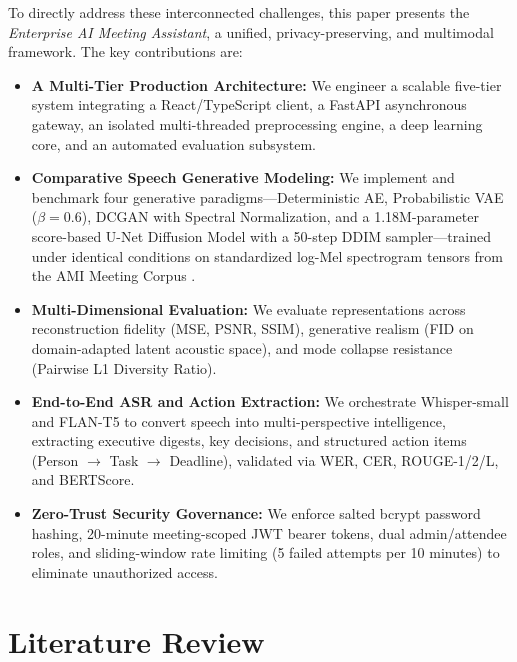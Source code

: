 \documentclass[conference]{IEEEtran}
\begin{document}
To directly address these interconnected challenges, this paper presents the \textit{Enterprise AI Meeting Assistant}, a unified, privacy-preserving, and multimodal framework. The key contributions are:
\begin{itemize}
    \item \textbf{A Multi-Tier Production Architecture:} We engineer a scalable five-tier system integrating a React/TypeScript client, a FastAPI asynchronous gateway, an isolated multi-threaded preprocessing engine, a deep learning core, and an automated evaluation subsystem.
    \item \textbf{Comparative Speech Generative Modeling:} We implement and benchmark four generative paradigms---Deterministic AE, Probabilistic VAE ($\beta = 0.6$), DCGAN with Spectral Normalization, and a 1.18M-parameter score-based U-Net Diffusion Model with a 50-step DDIM sampler---trained under identical conditions on standardized log-Mel spectrogram tensors from the AMI Meeting Corpus \cite{carletta2005ami}.
    \item \textbf{Multi-Dimensional Evaluation:} We evaluate representations across reconstruction fidelity (MSE, PSNR, SSIM), generative realism (FID on domain-adapted latent acoustic space), and mode collapse resistance (Pairwise L1 Diversity Ratio).
    \item \textbf{End-to-End ASR and Action Extraction:} We orchestrate Whisper-small and FLAN-T5 to convert speech into multi-perspective intelligence, extracting executive digests, key decisions, and structured action items (Person $\to$ Task $\to$ Deadline), validated via WER, CER, ROUGE-1/2/L, and BERTScore.
    \item \textbf{Zero-Trust Security Governance:} We enforce salted bcrypt password hashing, 20-minute meeting-scoped JWT bearer tokens, dual admin/attendee roles, and sliding-window rate limiting (5 failed attempts per 10 minutes) to eliminate unauthorized access.
\end{itemize}

\section{Literature Review}
\label{sec:lit_review}
\end{document}

